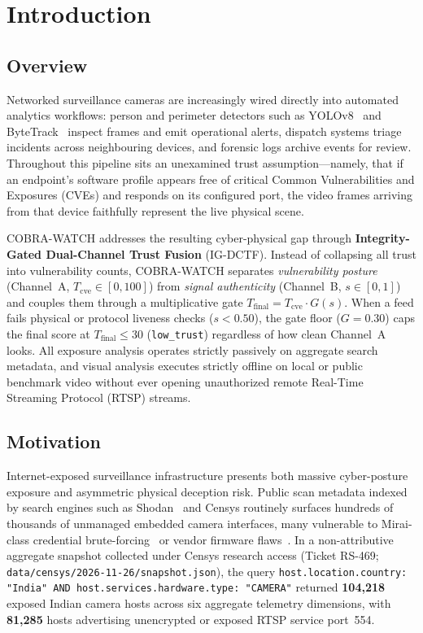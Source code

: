 \chapter{Introduction}

\section{Overview}\label{sec:intro_overview}
Networked surveillance cameras are increasingly wired directly into automated analytics workflows: person and perimeter detectors such as YOLOv8~\cite{jocher2023yolov8} and ByteTrack~\cite{zhang2022bytetrack} inspect frames and emit operational alerts, dispatch systems triage incidents across neighbouring devices, and forensic logs archive events for review. Throughout this pipeline sits an unexamined trust assumption---namely, that if an endpoint's software profile appears free of critical Common Vulnerabilities and Exposures (CVEs) and responds on its configured port, the video frames arriving from that device faithfully represent the live physical scene.

COBRA-WATCH addresses the resulting cyber-physical gap through \textbf{Integrity-Gated Dual-Channel Trust Fusion} (IG-DCTF). Instead of collapsing all trust into vulnerability counts, COBRA-WATCH separates \emph{vulnerability posture} (Channel~A, $T_{\mathrm{cve}} \in [0, 100]$) from \emph{signal authenticity} (Channel~B, $s \in [0, 1]$) and couples them through a multiplicative gate $T_{\mathrm{final}} = T_{\mathrm{cve}} \cdot G(s)$. When a feed fails physical or protocol liveness checks ($s < 0.50$), the gate floor ($G = 0.30$) caps the final score at $T_{\mathrm{final}} \le 30$ (\texttt{low\_trust}) regardless of how clean Channel~A looks. All exposure analysis operates strictly passively on aggregate search metadata, and visual analysis executes strictly offline on local or public benchmark video without ever opening unauthorized remote Real-Time Streaming Protocol (RTSP) streams.

\section{Motivation}
Internet-exposed surveillance infrastructure presents both massive cyber-posture exposure and asymmetric physical deception risk. Public scan metadata indexed by search engines such as Shodan~\cite{matherly2015shodan} and Censys routinely surfaces hundreds of thousands of unmanaged embedded camera interfaces, many vulnerable to Mirai-class credential brute-forcing~\cite{antonakakis2017mirai,griffioen2020mirai} or vendor firmware flaws~\cite{das2022kalay}. In a non-attributive aggregate snapshot collected under Censys research access (Ticket RS-469; \texttt{data/censys/2026-11-26/snapshot.json}), the query \texttt{host.location.country: "India" AND host.services.hardware.type: "CAMERA"} returned \textbf{104,218} exposed Indian camera hosts across six aggregate telemetry dimensions, with \textbf{81,285} hosts advertising unencrypted or exposed RTSP service port~554.

